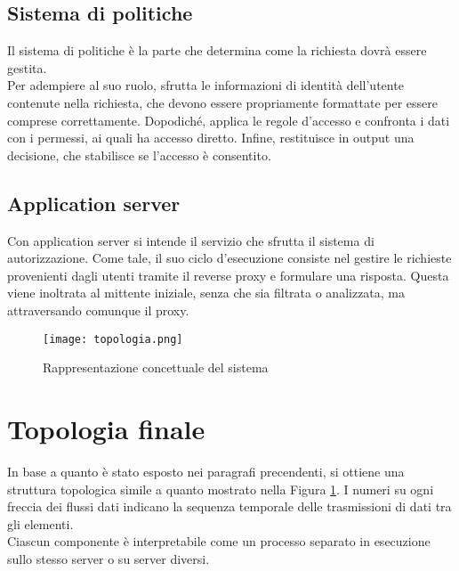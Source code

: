 \subsection{Sistema di politiche}
Il sistema di politiche è la parte che determina come la richiesta dovrà essere gestita. 
\\ Per adempiere al suo ruolo, sfrutta le informazioni di identità dell'utente contenute nella richiesta, 
che devono essere propriamente formattate per essere comprese correttamente. 
Dopodiché, applica le regole d'accesso e confronta i dati con i permessi, ai quali ha accesso diretto.
Infine, restituisce in output una decisione, che stabilisce se l'accesso è consentito.  

\subsection{Application server} \label{serv_server}
Con application server si intende il servizio che sfrutta il sistema di autorizzazione. Come tale,
 il suo ciclo d'esecuzione consiste nel gestire 
le richieste provenienti dagli utenti tramite
 il reverse proxy e formulare una risposta.
Questa viene inoltrata al mittente iniziale, senza che sia filtrata o analizzata, ma attraversando comunque il proxy.

\begin{figure}[h]
    \texttt{[image: topologia.png]}
    \centering
    \caption{Rappresentazione concettuale del sistema}
    \label{topologia}
\end{figure}

\section{Topologia finale}
In base a quanto è stato esposto nei paragrafi precendenti, si ottiene una struttura topologica simile a quanto mostrato nella Figura \ref{topologia}. 
I numeri su ogni freccia dei flussi dati indicano la sequenza temporale delle trasmissioni di dati tra gli elementi. 
\\Ciascun componente è interpretabile come un processo separato in esecuzione sullo stesso server o su server diversi. 
